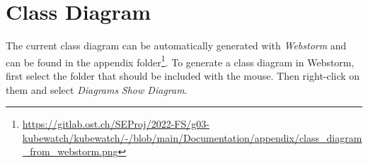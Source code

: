 \section{Class Diagram}
The current class diagram can be automatically generated with \textit{Webstorm} and can be found in the appendix
folder\footnote{\url{https://gitlab.ost.ch/SEProj/2022-FS/g03-kubewatch/kubewatch/-/blob/main/Documentation/appendix/class_diagram_from_webstorm.png}}.
To generate a class diagram in Webstorm, first select the folder that should be included with the mouse.
Then right-click on them and select \textit{Diagrams} \textrightarrow \textit{Show Diagram}.
